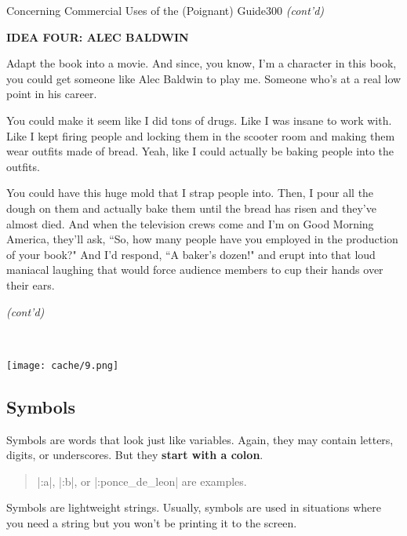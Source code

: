 \documentclass[12pt,twoside]{report}
\begin{document}
	\begin{sidebar}{Concerning Commercial Uses of the (Poignant) Guide}{300}
		\textit{(cont'd)} \vspace{6pt}
		
		\textbf{IDEA FOUR: ALEC BALDWIN}\vspace{6pt}
		
		Adapt the book into a movie. And since, you know, I'm a character in this book, you could get someone like Alec Baldwin to play me. Someone who's at a real low point in his career.\vspace{6pt}
		
		You could make it seem like I did tons of drugs. Like I was insane to work with. Like I kept firing people and locking them in the scooter room and making them wear outfits made of bread. Yeah, like I could actually be baking people into the outfits.\vspace{6pt}
		
		You could have this huge mold that I strap people into. Then, I pour all the dough on them and actually bake them until the bread has risen and they've almost died. And when the television crews come and I'm on Good Morning America, they'll ask, ``So, how many people have you employed in the production of your book?" And I'd respond, ``A baker's dozen!" and erupt into that loud maniacal laughing that would force audience members to cup their hands over their ears. \vspace{6pt}
		
		\textit{(cont'd)} \vspace{6pt}
	\end{sidebar}


\ %

	\hspace{2.3cm}\texttt{[image: cache/9.png]}

\subsection{Symbols}

Symbols are words that look just like variables.  Again, they may
contain letters, digits, or underscores.  But they {\bf start with a
  colon}.

\begin{quote}
\rubyinline|:a|, \rubyinline|:b|, or
\rubyinline|:ponce_de_leon| are examples.\end{quote}


Symbols are lightweight strings.  Usually, symbols are used in
situations where you need a string but you won't be printing it to the
screen.
\end{document}

